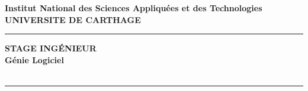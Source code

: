 \begin{titlepage}
   \begin{center}
   \begin{doublespacing}

       \begin{figure}
       \begin{center}

        \begin{minipage}[c]{0.8\textwidth}
        \end{minipage}
        \hfill
        \hfill
        \end{center}
        \end{figure}
       
       {\Large\textbf{Institut National des Sciences Appliquées et des Technologies}\\}
       {\Large\textbf{UNIVERSITE DE CARTHAGE}\\}
       \noindent\rule{15cm}{0.4pt}
       {\Huge\textbf{STAGE INGÉNIEUR}\\}
       {\large\textbf{Génie Logiciel}\\}
       {\Large\textbf{\ProjectTitle}\\}

       \vspace{10 mm}
       \vspace{2.5 mm}
       {\huge\textbf{}}
       \noindent\rule{15cm}{0.5pt}
       \vspace{10 mm}
       


\end{doublespacing}
\end{center}
\end{titlepage}
